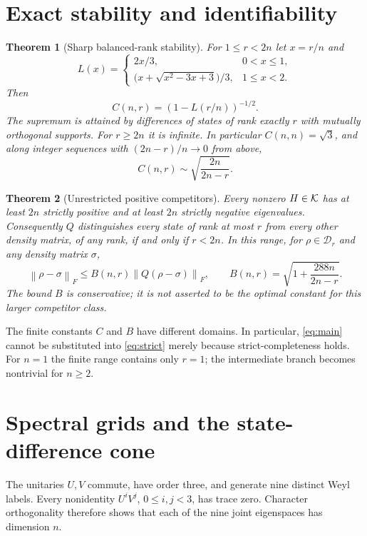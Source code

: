 \documentclass[11pt,a4paper]{article}
\newtheorem{theorem}{Theorem}
\theoremstyle{remark}\newtheorem{remark}[theorem]{Remark}
\newcommand{\DD}{\mathcal D}\newcommand{\norm}[1]{\left\|#1\right\|_{\!F}}
\begin{document}
\section{Exact stability and identifiability}
\begin{theorem}[Sharp balanced-rank stability]\label{thm:sharp}
For $1\le r<2n$ let $x=r/n$ and
\[
 L(x)=
 \begin{cases}
  2x/3,&0<x\le1,\\[2pt]
  \bigl(x+\sqrt{x^2-3x+3}\bigr)/3,&1\le x<2 .
 \end{cases}
\]
Then
\begin{equation}\label{eq:main}
 C(n,r)=(1-L(r/n))^{-1/2}.
\end{equation}
The supremum is attained by differences of states of rank exactly $r$
with mutually orthogonal supports. For $r\ge2n$ it is infinite.
In particular $C(n,n)=\sqrt3$, and along integer sequences with
$(2n-r)/n\to0$ from above,
\[
 C(n,r)\sim\sqrt{\frac{2n}{2n-r}}.
\]
\end{theorem}

\begin{theorem}[Unrestricted positive competitors]\label{thm:strict}
Every nonzero $H\in\mathcal K$ has at least $2n$ strictly positive and at least
$2n$ strictly negative eigenvalues. Consequently $Q$ distinguishes every
state of rank at most $r$ from every other density matrix, of any rank,
if and only if $r<2n$. In this range, for $\rho\in\DD_r$ and any density
matrix $\sigma$,
\begin{equation}\label{eq:strict}
 \norm{\rho-\sigma}\le B(n,r)\norm{Q(\rho-\sigma)},\qquad
 B(n,r)=\sqrt{1+\frac{288n}{2n-r}} .
\end{equation}
The bound $B$ is conservative; it is not asserted to be the optimal
constant for this larger competitor class.
\end{theorem}

The finite constants $C$ and $B$ have different domains. In particular,
\eqref{eq:main} cannot be substituted into \eqref{eq:strict} merely
because strict-completeness holds. For $n=1$ the finite range contains
only $r=1$; the intermediate branch becomes nontrivial for $n\ge2$.

\section{Spectral grids and the state-difference cone}
The unitaries $U,V$ commute, have order three, and generate nine distinct
Weyl labels. Every nonidentity $U^iV^j$, $0\le i,j<3$, has trace zero.
Character orthogonality therefore shows that each of the nine joint
eigenspaces has dimension $n$.
\end{document}
